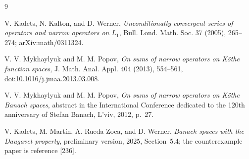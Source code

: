 \documentclass[11pt]{article}
\begin{document}
\begin{thebibliography}{9}
\raggedright
{}
V. Kadets, N. Kalton, and D. Werner,
\emph{Unconditionally convergent series of operators and narrow operators on
$L_1$}, Bull. Lond. Math. Soc. 37 (2005), 265--274;
arXiv:math/0311324.

V. V. Mykhaylyuk and M. M. Popov,
\emph{On sums of narrow operators on K\"othe function spaces},
J. Math. Anal. Appl. 404 (2013), 554--561,
\href{https://doi.org/10.1016/j.jmaa.2013.03.008}{doi:10.1016/j.jmaa.2013.03.008}.

V. V. Mykhaylyuk and M. M. Popov,
\emph{On sums of narrow operators on K\"othe Banach spaces}, abstract in the
International Conference dedicated to the 120th anniversary of Stefan Banach,
L'viv, 2012, p.~27.

V. Kadets, M. Mart\'in, A. Rueda Zoca, and D. Werner,
\emph{Banach spaces with the Daugavet property}, preliminary version, 2025,
Section~5.4; the counterexample paper is reference [236].
\end{thebibliography}
\end{document}
